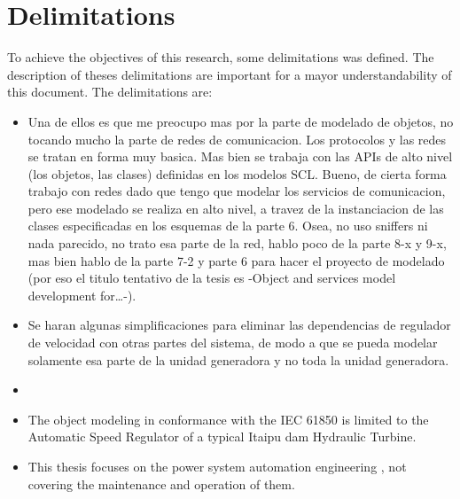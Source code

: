 \section{Delimitations}

To achieve the objectives of this 
research, some delimitations was 
defined. The description of theses 
delimitations are important 
for a mayor understandability of 
this document. The delimitations are:


\begin{itemize}
  \item Una de ellos es que me preocupo mas 
  por la parte de modelado de objetos, no tocando 
  mucho la parte de redes de comunicacion. Los protocolos
  y las redes se tratan en forma muy basica. Mas bien se trabaja
  con las APIs de alto nivel (los objetos, las clases) definidas
  en los modelos SCL. Bueno, de cierta forma trabajo con redes 
  dado que tengo que modelar los servicios de comunicacion, 
  pero ese modelado se realiza en alto nivel, a travez 
  de la instanciacion de las clases especificadas 
  en los esquemas de la parte 6. Osea, no uso 
  sniffers ni nada parecido, no trato esa parte 
  de la red, hablo poco de la parte 8-x y 9-x,
  mas bien hablo de la parte 7-2 y parte 6 
  para hacer el proyecto de modelado
  (por eso el titulo tentativo de la tesis es 
  -Object and services model development for\ldots-).
  \item Se haran algunas simplificaciones para eliminar 
  las dependencias de regulador de velocidad con otras 
  partes del sistema, de modo a que se pueda modelar 
  solamente esa parte de la unidad generadora y 
  no toda la unidad generadora.
  \item {} 
 
  \item The object modeling in conformance with the IEC 61850 
  is limited to the
  Automatic Speed Regulator of a typical Itaipu dam Hydraulic Turbine.
  
   \item This thesis focuses on the 
   power system automation engineering 
   , 
   not covering the maintenance and operation of them.
\end{itemize} 